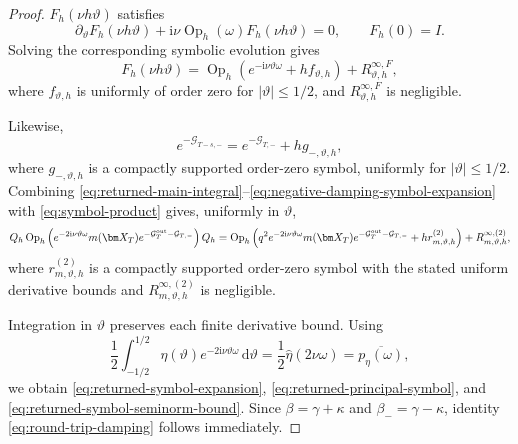 \documentclass[11pt,reqno]{amsart}
\newcommand{\ii}{\mathrm{i}}
\newcommand{\dd}{\,\mathrm{d}}
\newcommand{\Op}{\operatorname{Op}}
\numberwithin{equation}{section}
\begin{document}
\begin{proof}
$F_h(\nu h\vartheta)$ satisfies
$$
    \partial_\vartheta F_h(\nu h\vartheta) +\ii\nu\Op_h(\omega)F_h(\nu h\vartheta)=0, \qquad F_h(0)=I. 
$$
Solving the corresponding symbolic evolution gives
$$
    F_h(\nu h\vartheta) = \Op_h(e^{-\ii\nu\vartheta\omega}+hf_{\vartheta,h})+R_{\vartheta,h}^{\infty,F},
$$
where $f_{\vartheta,h}$ is uniformly of order zero for $|\vartheta|\leq 1/2$, and $R_{\vartheta,h}^{\infty, F}$ is negligible.

Likewise,
\begin{equation}\label{eq:negative-damping-symbol-expansion}
 e^{-\mathcal G_{T-s,-}}=e^{-\mathcal G_{T,-}}+h g_{-,\vartheta,h},
\end{equation}
where $g_{-,\vartheta,h}$ is a compactly supported order-zero symbol, uniformly for $|\vartheta|\le1/2$. Combining \eqref{eq:returned-main-integral}--\eqref{eq:negative-damping-symbol-expansion} with \eqref{eq:symbol-product} gives, uniformly in $\vartheta$,
\begin{equation*}
 Q_h\Op_h\left(e^{-2\ii\nu\vartheta\omega}m(\bm X_T)e^{-\mathcal G_T^{\rm out}-\mathcal G_{T,-}}\right)Q_h
 =\Op_h\left(q^2e^{-2\ii\nu\vartheta\omega}
 m(\bm X_T)e^{-\mathcal G_T^{\rm out}-\mathcal G_{T,-}}
 +h r_{m,\vartheta,h}^{(2)}\right)+R_{m,\vartheta,h}^{\infty,(2)},
\end{equation*}
where $r_{m,\vartheta,h}^{(2)}$ is a compactly supported order-zero symbol with the stated uniform derivative bounds and $R_{m,\vartheta,h}^{\infty,(2)}$ is negligible.

Integration in $\vartheta$ preserves each finite derivative bound. Using
\begin{equation*}
 \frac12\int_{-1/2}^{1/2}\eta(\vartheta)e^{-2\ii\nu\vartheta\omega}\dd\vartheta=\frac12\widehat\eta(2\nu\omega)=\overline{p_\eta(\omega)},
\end{equation*}
we obtain \eqref{eq:returned-symbol-expansion}, \eqref{eq:returned-principal-symbol}, and \eqref{eq:returned-symbol-seminorm-bound}. Since $\beta=\gamma+\kappa$ and $\beta_-=\gamma-\kappa$, identity \eqref{eq:round-trip-damping} follows immediately.
\end{proof}
\end{document}
